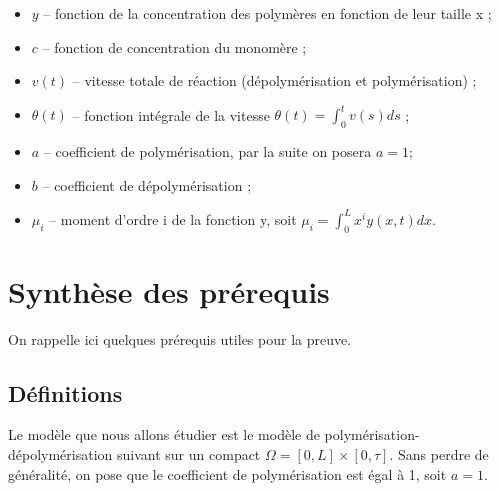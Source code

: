 \documentclass[a4paper]{article}
\newcommand{\pol}{a}
\newcommand{\dep}{b}
\begin{document}
\begin{itemize}
\item $y$ -- fonction de la concentration des polymères en fonction de leur taille x ;
\item $c$ -- fonction de concentration du monomère ;
\item $v(t)$ -- vitesse totale de réaction (dépolymérisation et polymérisation) ;
\item $\theta(t)$ -- fonction intégrale de la vitesse $\theta(t)=\int_0^t v(s)ds$ ;
\item $\pol$ -- coefficient de polymérisation, par la suite on posera $\pol=1$;
\item $\dep$ -- coefficient de dépolymérisation ;
\item $\mu_i$ -- moment d'ordre i de la fonction y, soit $\mu_i = \int_0^L x^i y(x,t)dx$.
\end{itemize}



\section{Synthèse des prérequis}

On rappelle ici quelques prérequis utiles pour la preuve.

\subsection{Définitions}

Le modèle que nous allons étudier est le modèle de polymérisation-dépolymérisation suivant 
sur un compact $\Omega = [0,L] \times [0,\tau]$. 
Sans perdre de généralité, 
on pose que le coefficient de polymérisation est égal à 1, 
soit $\pol =1$.
\end{document}
